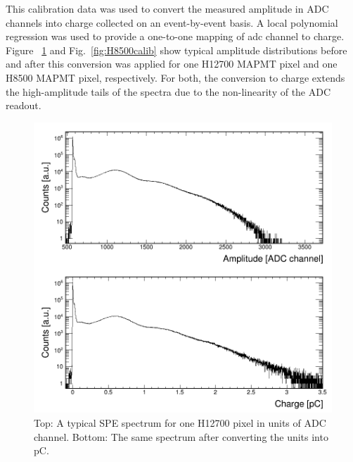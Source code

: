 This calibration data was used to convert the measured amplitude in ADC channels into charge collected on an event-by-event basis. A local polynomial regression was used to provide a one-to-one mapping of adc channel to charge. Figure ~\ref{fig:H12700calib} and Fig.~\ref{fig:H8500calib} show typical amplitude distributions before and after this conversion was applied for one H12700 MAPMT pixel and one H8500 MAPMT pixel, respectively. For both, the conversion to charge extends the high-amplitude tails of the spectra due to the non-linearity of the ADC readout.

\begin{figure}[hbt!]
	\centering
	\includegraphics[width=\linewidth]{figures/GA0982_w1_g064_v1100_063_adc_charge.png}
	\caption{Top: A typical SPE spectrum for one H12700 pixel in units of ADC channel. Bottom: The same spectrum after converting the units into pC.}
	\label{fig:H12700calib}
\end{figure}

